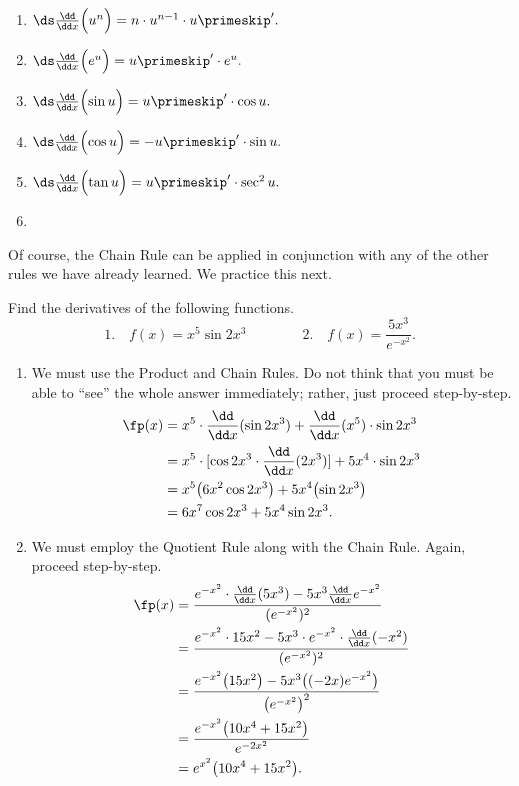 \begin{multicols}{2}
\begin{enumerate}
	\item	$\ds\frac{\dd}{\dd x}\Bigl(u^n\Bigr) = n\cdot u^{n-1}\cdot u\primeskip'.$
	\item	$\ds\frac{\dd}{\dd x}\Bigl(e^u\Bigr) = u\primeskip'\cdot e^u.$
	\item	$\ds\frac{\dd}{\dd x}\Bigl(\sin u\Bigr) = u\primeskip'\cdot \cos u.$
	\item	$\ds\frac{\dd}{\dd x}\Bigl(\cos u\Bigr) = -u\primeskip'\cdot \sin u.$
	\item	$\ds\frac{\dd}{\dd x}\Bigl(\tan u\Bigr) = u\primeskip'\cdot \sec^2 u.$
	\item[]\bigskip
\end{enumerate}
\end{multicols}

Of course, the Chain Rule can be applied in conjunction with any of the other rules we have already learned. We practice this next.

\begin{example}\label{ex_chain4}
Find the derivatives of the following functions.
\[
 1.\quad f(x) = x^5 \sin{2x^3} \qquad\qquad 2.\quad f(x) = \dfrac{5x^3}{e^{-x^2}}.
\]
\solution
\begin{enumerate}
\item	We must use the Product and Chain Rules. Do not think that you must be able to ``see'' the whole answer immediately; rather, just proceed step-by-step.
\begin{align*}
 \fp(x)
 &= x^5 \cdot \frac{\dd}{\dd x}(\sin 2x^3) + \frac{\dd}{\dd x}(x^5) \cdot \sin 2x^3\\
 &= x^5 \cdot [\cos 2x^3 \cdot \frac{\dd}{\dd x}(2x^3)] + 5x^4 \cdot \sin 2x^3\\
 &= x^5\bigl(6x^2\cos 2x^3\bigr) + 5x^4\bigl(\sin 2x^3\bigr)\\
 &= 6x^7\cos2x^3+5x^4\sin 2x^3.
\end{align*}
\item	We must employ the Quotient Rule along with the Chain Rule. Again, proceed step-by-step.
\begin{align*}
 \fp(x)
 &= \frac{e^{-x^2} \cdot \frac{\dd}{\dd x}(5x^3) - 5x^3\frac{\dd}{\dd x}e^{-x^2}}{(e^{-x^2})^2}\\
 &= \frac{e^{-x^2} \cdot 15x^2 - 5x^3 \cdot e^{-x^2} \cdot \frac{\dd}{\dd x}(-x^2)}{(e^{-x^2})^2}\\
 &= \frac{e^{-x^2}\bigl(15x^2\bigr) - 5x^3\bigl((-2x)e^{-x^2}\bigr)}{\bigl(e^{-x^2}\bigr)^2}\\
 &=\frac{e^{-x^2}\bigl(10x^4+15x^2\bigr)}{e^{-2x^2}}\\
 &= e^{x^2}\bigl(10x^4+15x^2\bigr).
\end{align*}
\end{enumerate}
\end{example}

